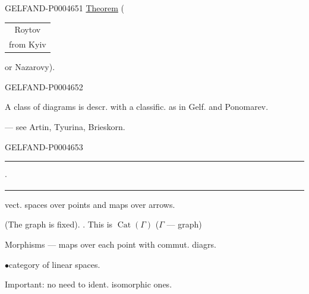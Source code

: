 \begin{GelfandAdjacentEvidence}{GELFAND-P000465}{1}
\underline{Theorem}\quad
(\begin{tabular}[t]{@{}c@{}}Roytov\\[-.45ex]\scriptsize from Kyiv\end{tabular}
or Nazarovy).
\end{GelfandAdjacentEvidence}
\begin{GelfandAdjacentEvidence}{GELFAND-P000465}{2}


A class of diagrams is descr. with a classific. as in Gelf. and Ponomarev.

\quad — see Artin, Tyurina, Brieskorn.
\end{GelfandAdjacentEvidence}
\begin{GelfandAdjacentEvidence}{GELFAND-P000465}{3}


\begin{center}
\rule[.5ex]{18mm}{.35pt}\enspace$\cdot$\enspace\rule[.5ex]{25mm}{.35pt}
\end{center}

\quad {} vect. spaces over points and maps over arrows.

(The graph is fixed). \quad {}. This is $\operatorname{Cat}(\Gamma)$
($\Gamma$ — graph)

Morphisms — maps over each point with commut. diagrs.

$\bullet$\qquad category of linear spaces.

Important: no need to ident. isomorphic ones.
\end{GelfandAdjacentEvidence}
